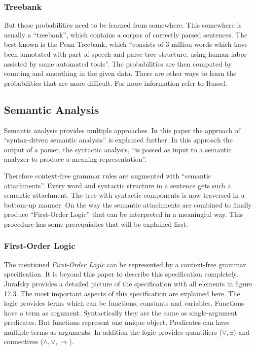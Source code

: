 \documentclass[12pt,twoside]{scrartcl}
\theoremstyle{plain}
\theoremstyle{definition}
\theoremstyle{remark}
\begin{document}
		\subsubsection*{Treebank}
		\label{subSubSec:treebank}
		
		But these probabilities need to be learned from somewhere. This somewhere is usually a ``treebank''\cite[p.~895]{Russel2010}, which contains a corpus of correctly parsed sentences. The best known is the Penn Treebank\cite{Russel2010}, which ``consists of 3 million words which have been annotated with part of speech and parse-tree structure, using human labor assisted by some automated tools''\cite[p.~895]{Russel2010}. The probabilities are then computed by counting and smoothing in the given data.\cite{Russel2010} There are other ways to learn the probabilities that are more difficult. For more information refer to Russel\cite{Russel2010}.		
		
	\subsection{Semantic Analysis}
	\label{subSec:semanticAnalysis}
	
		Semantic analysis provides multiple approaches. In this paper the approach of ``syntax-driven semantic analysis''\cite[p.~617]{Jurafsky2009} is explained further. In this approach the output of a parser, the syntactic analysis, ``is passed as input to a semantic analyzer to produce a meaning representation''\cite[p.~618]{Jurafsky2009}.

		Therefore context-free grammar rules are augmented with ``semantic attachments''\cite[p.~618]{Jurafsky2009}. Every word and syntactic structure in a sentence gets such a semantic attachment. The tree with syntactic components is now traversed in a bottom-up manner. On the way the semantic attachments are combined to finally produce ``First-Order Logic''\cite[p.~589]{Jurafsky2009a} that can be interpreted in a meaningful way. This procedure has some prerequisites that will be explained first.
		
		\subsubsection*{First-Order Logic}
		\label{subSubSec:firstOrderLogic}
		
		The mentioned \textit{First-Order Logic} can be represented by a context-free grammar specification. It is beyond this paper to describe this specification completely. Jurafsky\cite{Jurafsky2009a} provides a detailed picture of the specification with all elements in figure 17.3. The most important aspects of this specification are explained here. The logic provides terms which can be functions, constants and variables. Functions have a term as argument. Syntactically they are the same as single-argument predicates. But functions represent one unique object.
		Predicates can have multiple terms as arguments. In addition the logic provides quantifiers ($\forall, \exists$) and connectives ($\wedge, \vee, \Rightarrow$).
		
\end{document}
